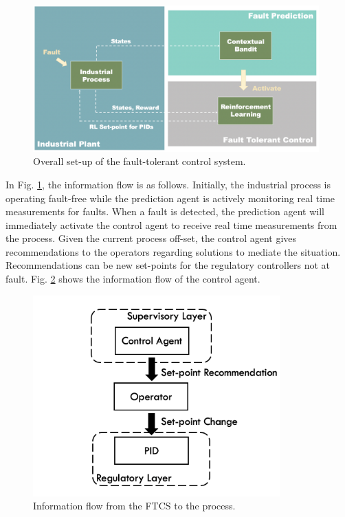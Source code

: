 \begin{figure}[H]
    \begin{center}
        \includegraphics[width=11cm]{images/ftc/FTC_Setup.png}
        \caption{\label{fig:ftc_setup} Overall set-up of the fault-tolerant control system.}
    \end{center}
\end{figure}
In Fig. \ref{fig:ftc_setup}, the information flow is as follows.  Initially, the industrial process is operating fault-free while the prediction agent is actively monitoring real time measurements for faults.  When a fault is detected, the prediction agent will immediately activate the control agent to receive real time measurements from the process.  Given the current process off-set, the control agent gives recommendations to the operators regarding solutions to mediate the situation.  Recommendations can be new set-points for the regulatory controllers not at fault.
Fig. \ref{fig:ftc_pid_setup} shows the information flow of the control agent. 
\begin{figure}[H]
    \begin{center}
        \includegraphics[width=9.5cm]{images/ftc/ftc_pid_setup.png}
        \caption{\label{fig:ftc_pid_setup} Information flow from the FTCS to the process.}
    \end{center}
\end{figure}
